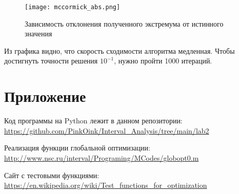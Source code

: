 \begin{figure}[h]
	\centering
	\texttt{[image: mccormick\_abs.png]}
	\caption{Зависимость отклонения полученного экстремума от истинного значения}
\end{figure}

Из графика видно, что скорость сходимости алгоритма медленная. Чтобы достигнуть точности решения $10^{-1}$, нужно пройти 1000 итераций.



\section{Приложение}
Код программы на Python лежит в данном репозитории: \\
\url{https://github.com/PinkOink/Interval_Analysis/tree/main/lab2}{}

Реализация функции глобальной оптимизации: \\
\url{http://www.nsc.ru/interval/Programing/MCodes/globopt0.m}{}

Сайт с тестовыми функциями: \\
\url{https://en.wikipedia.org/wiki/Test_functions_for_optimization}{}


